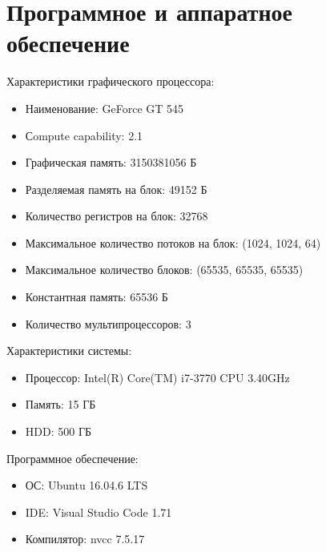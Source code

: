 \section{Программное и аппаратное обеспечение}
Характеристики графического процессора:
\begin{itemize}[noitemsep, topsep=0pt]
	\item Наименование: GeForce GT 545
	\item Сompute capability: 2.1
	\item Графическая память: 3150381056 Б
	\item Разделяемая память на блок: 49152 Б
	\item Количество регистров на блок: 32768
	\item Максимальное количество потоков на блок: (1024, 1024, 64)
	\item Максимальное количество блоков: (65535, 65535, 65535)
	\item Константная память: 65536 Б
	\item Количество мультипроцессоров: 3
\end{itemize}

Характеристики системы:
\begin{itemize}[noitemsep, topsep=0pt]
	\item Процессор: Intel(R) Core(TM) i7-3770 CPU \@ 3.40GHz
	\item Память: 15 ГБ
	\item HDD: 500 ГБ
\end{itemize}

Программное обеспечение:
\begin{itemize}[noitemsep, topsep=0pt]
	\item ОС: Ubuntu 16.04.6 LTS
	\item IDE: Visual Studio Code 1.71
	\item Компилятор: nvcc 7.5.17
\end{itemize}